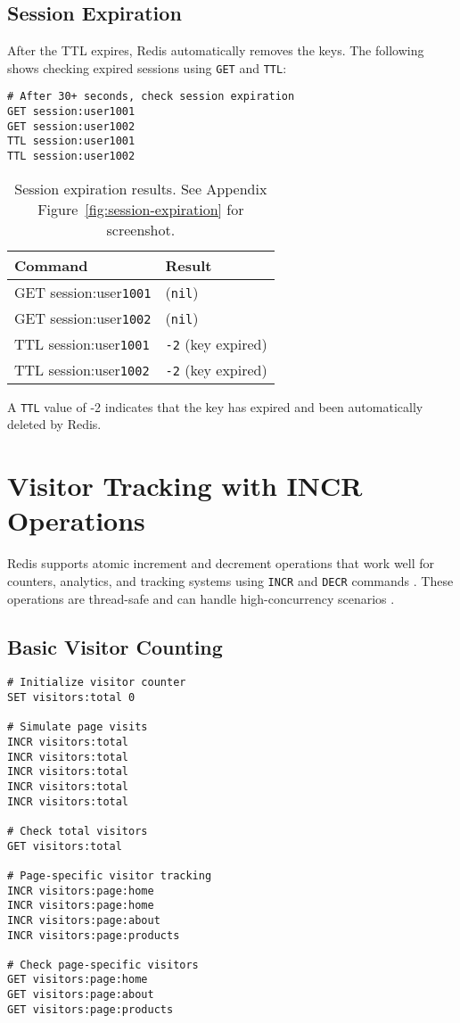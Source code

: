 \subsection{Session Expiration}

After the TTL expires, Redis automatically removes the keys. The following shows checking expired sessions using \texttt{GET} and \texttt{TTL}:

\begin{verbatim}
# After 30+ seconds, check session expiration
GET session:user1001
GET session:user1002
TTL session:user1001
TTL session:user1002
\end{verbatim}

\begin{table}[H]
  \centering
  \begin{tabular}{|l|l|}
    \hline
    \textbf{Command} & \textbf{Result} \\
    \hline
    GET session:user\texttt{1001} & (\texttt{nil}) \\
    GET session:user\texttt{1002} & (\texttt{nil}) \\
    TTL session:user\texttt{1001} & \texttt{-2} (key expired) \\
    TTL session:user\texttt{1002} & \texttt{-2} (key expired) \\
    \hline
  \end{tabular}
  \caption{Session expiration results. See Appendix Figure~\ref{fig:session-expiration} for screenshot.}
\end{table}

A \texttt{TTL} value of -2 indicates that the key has expired and been automatically deleted by Redis.

\section{Visitor Tracking with INCR Operations}

Redis supports atomic increment and decrement operations that work well for counters, analytics, and tracking systems using \texttt{INCR} and \texttt{DECR} commands \parencite{redis_documentation}. These operations are thread-safe and can handle high-concurrency scenarios \parencite{redis_paper}.

\subsection{Basic Visitor Counting}

\begin{verbatim}
# Initialize visitor counter
SET visitors:total 0

# Simulate page visits
INCR visitors:total
INCR visitors:total
INCR visitors:total
INCR visitors:total
INCR visitors:total

# Check total visitors
GET visitors:total

# Page-specific visitor tracking
INCR visitors:page:home
INCR visitors:page:home
INCR visitors:page:about
INCR visitors:page:products

# Check page-specific visitors
GET visitors:page:home
GET visitors:page:about
GET visitors:page:products
\end{verbatim}

